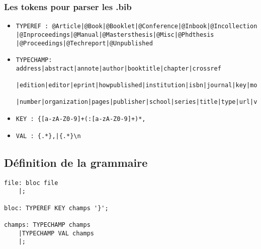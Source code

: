 \documentclass[hidelinks, a4paper,11pt,twoside,final]{article}
\begin{document}
\subsubsection {Les tokens pour parser les .bib}
\begin{itemize}
 
 \item \begin{verbatim}TYPEREF : @Article|@Book|@Booklet|@Conference|@Inbook|@Incollection 
|@Inproceedings|@Manual|@Mastersthesis|@Misc|@Phdthesis
|@Proceedings|@Techreport|@Unpublished\end{verbatim}

 \item  \begin{verbatim}TYPECHAMP: address|abstract|annote|author|booktitle|chapter|crossref
 |edition|editor|eprint|howpublished|institution|isbn|journal|key|month|note
 |number|organization|pages|publisher|school|series|title|type|url|volume|year\end{verbatim}
 
 \item \begin{verbatim}KEY : {[a-zA-Z0-9]+(:[a-zA-Z0-9]+)*,\end{verbatim}
 
 \item \begin{verbatim}VAL : {.*},|{.*}\n\end{verbatim}
\end{itemize} 

\subsection{Définition de la grammaire}

\begin{lstlisting}
file: bloc file
    |;

bloc: TYPEREF KEY champs '}';

champs: TYPECHAMP champs
    |TYPECHAMP VAL champs
    |;
\end{lstlisting}
\end{document}
